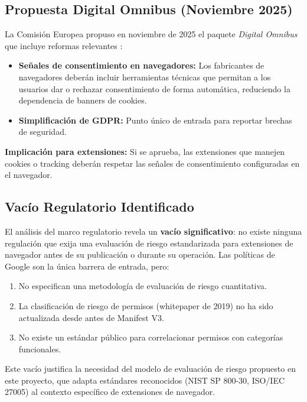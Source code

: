 \documentclass[12pt,oneside]{report}
\begin{document}
\subsection{Propuesta Digital Omnibus (Noviembre 2025)}

La Comisión Europea propuso en noviembre de 2025 el paquete \textit{Digital Omnibus} que incluye reformas relevantes \cite{eu_digital_omnibus}:

\begin{itemize}
    \item \textbf{Señales de consentimiento en navegadores:} Los fabricantes de navegadores deberán incluir herramientas técnicas que permitan a los usuarios dar o rechazar consentimiento de forma automática, reduciendo la dependencia de banners de cookies.
    \item \textbf{Simplificación de GDPR:} Punto único de entrada para reportar brechas de seguridad.
\end{itemize}

\textbf{Implicación para extensiones:} Si se aprueba, las extensiones que manejen cookies o tracking deberán respetar las señales de consentimiento configuradas en el navegador.

\subsection{Vacío Regulatorio Identificado}

El análisis del marco regulatorio revela un \textbf{vacío significativo}: no existe ninguna regulación que exija una evaluación de riesgo estandarizada para extensiones de navegador antes de su publicación o durante su operación. Las políticas de Google son la única barrera de entrada, pero:

\begin{enumerate}
    \item No especifican una metodología de evaluación de riesgo cuantitativa.
    \item La clasificación de riesgo de permisos (whitepaper de 2019) no ha sido actualizada desde antes de Manifest V3.
    \item No existe un estándar público para correlacionar permisos con categorías funcionales.
\end{enumerate}

Este vacío justifica la necesidad del modelo de evaluación de riesgo propuesto en este proyecto, que adapta estándares reconocidos (NIST SP 800-30, ISO/IEC 27005) al contexto específico de extensiones de navegador.
\end{document}
